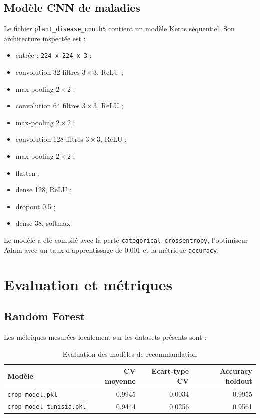 \documentclass[12pt,a4paper]{report}
\begin{document}
\subsection{Modèle CNN de maladies}
Le fichier \texttt{plant\_disease\_cnn.h5} contient un modèle Keras séquentiel. Son architecture inspectée est :
\begin{itemize}[noitemsep]
  \item entrée : \texttt{224 x 224 x 3} ;
  \item convolution 32 filtres \(3 \times 3\), ReLU ;
  \item max-pooling \(2 \times 2\) ;
  \item convolution 64 filtres \(3 \times 3\), ReLU ;
  \item max-pooling \(2 \times 2\) ;
  \item convolution 128 filtres \(3 \times 3\), ReLU ;
  \item max-pooling \(2 \times 2\) ;
  \item flatten ;
  \item dense 128, ReLU ;
  \item dropout 0.5 ;
  \item dense 38, softmax.
\end{itemize}
Le modèle a été compilé avec la perte \texttt{categorical\_crossentropy}, l'optimiseur Adam avec un taux d'apprentissage de 0.001 et la métrique \texttt{accuracy}.

\section{Evaluation et métriques}
\subsection{Random Forest}
Les métriques mesurées localement sur les datasets présents sont :
\begin{table}[H]
\centering
\caption{Evaluation des modèles de recommandation}
\begin{tabular}{lrrr}
\toprule
\textbf{Modèle} & \textbf{CV moyenne} & \textbf{Ecart-type CV} & \textbf{Accuracy holdout} \\
\midrule
\texttt{crop\_model.pkl} & 0.9945 & 0.0034 & 0.9955 \\
\texttt{crop\_model\_tunisia.pkl} & 0.9444 & 0.0256 & 0.9561 \\
\bottomrule
\end{tabular}
\end{table}
\end{document}
